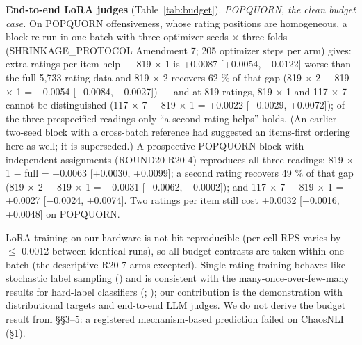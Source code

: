 \documentclass{article}
\begin{document}
\textbf{End-to-end LoRA judges} (Table~\ref{tab:budget}). \emph{POPQUORN, the clean budget case.} On POPQUORN offensiveness, whose rating positions are homogeneous, a block re-run in one batch with three optimizer seeds $\times$ three folds (SHRINKAGE\_PROTOCOL Amendment 7; 205 optimizer steps per arm) gives: extra ratings per item help --- 819 $\times$ 1 is +0.0087 {[}+0.0054, +0.0122{]} worse than the full 5,733-rating data and 819 $\times$ 2 recovers 62 \% of that gap (819 $\times$ 2 $-$ 819 $\times$ 1 = $-$0.0054 {[}$-$0.0084, $-$0.0027{]}) --- and at 819 ratings, 819 $\times$ 1 and 117 $\times$ 7 cannot be distinguished (117 $\times$ 7 $-$ 819 $\times$ 1 = +0.0022 {[}$-$0.0029, +0.0072{]}); of the three prespecified readings only ``a second rating helps'' holds. (An earlier two-seed block with a cross-batch reference had suggested an items-first ordering here as well; it is superseded.) A prospective POPQUORN block with independent assignments (ROUND20 R20-4) reproduces all three readings: 819 $\times$ 1 $-$ full = +0.0063 {[}+0.0030, +0.0099{]}; a second rating recovers 49 \% of that gap (819 $\times$ 2 $-$ 819 $\times$ 1 = $-$0.0031 {[}$-$0.0062, $-$0.0002{]}); and 117 $\times$ 7 $-$ 819 $\times$ 1 = +0.0027 {[}$-$0.0024, +0.0074{]}. Two ratings per item still cost +0.0032 {[}+0.0016, +0.0048{]} on POPQUORN.

LoRA training on our hardware is not bit-reproducible (per-cell RPS varies by $\leq$ 0.0012 between identical runs), so all budget contrasts are taken within one batch (the descriptive R20-7 arms excepted). Single-rating training behaves like stochastic label sampling (\citealp{gheibi2026same}) and is consistent with the many-once-over-few-many results for hard-label classifiers (\citealp{khetan2018learning}; \citealp{lin2014relabel}); our contribution is the demonstration with distributional targets and end-to-end LLM judges. We do not derive the budget result from \S{}\S{}3--5: a registered mechanism-based prediction failed on ChaosNLI (\S{}1).
\end{document}
